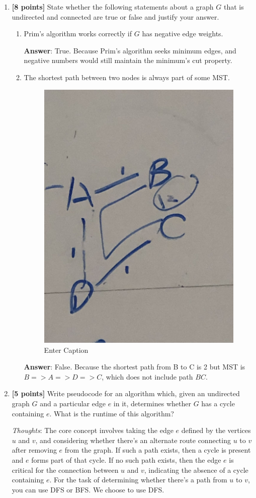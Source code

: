 \documentclass[11pt]{article}
\begin{document}
\begin{enumerate}
	
\item \textbf{[8 points]} State whether the following statements about a graph $G$ that is undirected and connected are true or false and justify your answer.

\begin{enumerate}

\item Prim's algorithm works correctly if $G$ has negative edge weights.

    \textbf{Answer}: True.  Because Prim's algorithm seeks minimum edges, and negative numbers would still maintain the minimum's cut property.

\item The shortest path between two nodes is always part of some MST.
\begin{figure}[h]
    \centering
    \includegraphics[width=0.3\linewidth]{WechatIMG308.jpeg}
    \caption{Enter Caption}
    \label{fig:enter-label}
\end{figure}
\textbf{Answer}: False. Because  the shortest path from B to C is 2 but MST is $B=>A=>D=>C$, which does not include path $BC$.


\end{enumerate}
\item \textbf{[5 points]} Write pseudocode for an algorithm which, given an undirected graph $G$ and a particular edge $e$ in it, determines whether $G$ has a cycle containing $e$.  What is the runtime of this algorithm?

\emph{Thoughts}: The core concept involves taking the edge $e$ defined by the vertices $u$ and $v$, and considering whether there's an alternate route connecting $u$ to $v$ after removing $e$ from the graph. If such a path exists, then a cycle is present and $e$ forms part of that cycle. If no such path exists, then the edge $e$ is critical for the connection between $u$ and $v$, indicating the absence of a cycle containing $e$. For the task of determining whether there's a path from $u$ to $v$, you can use DFS or BFS. We choose to use DFS.


\end{enumerate}
\end{document}

